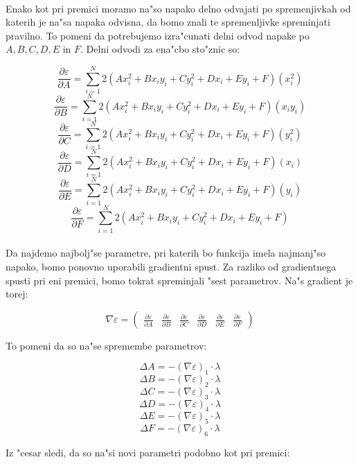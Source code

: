 \documentclass[a4paper, 12pt]{article}
\begin{document}
	\paragraph{}
	Enako kot pri premici moramo na"so napako delno odvajati po spremenjivkah od katerih je na"sa napaka odvisna, da bomo znali te spremenljivke spreminjati pravilno. To pomeni da potrebujemo izra"cunati delni odvod napake po $A, B, C, D, E$ in $F$. Delni odvodi za ena"cbo sto"znic so:
	
	$$\frac{\partial \varepsilon}{\partial A} = \sum_{i=1}^{N}2(Ax_i^2 + Bx_iy_i + Cy_i^2 + Dx_i + Ey_i + F)(x_i^2)$$
	$$\frac{\partial \varepsilon}{\partial B} = \sum_{i=1}^{N}2(Ax_i^2 + Bx_iy_i + Cy_i^2 + Dx_i + Ey_i + F)(x_iy_i)$$
	$$\frac{\partial \varepsilon}{\partial C} = \sum_{i=1}^{N}2(Ax_i^2 + Bx_iy_i + Cy_i^2 + Dx_i + Ey_i + F)(y_i^2)$$
	$$\frac{\partial \varepsilon}{\partial D} = \sum_{i=1}^{N}2(Ax_i^2 + Bx_iy_i + Cy_i^2 + Dx_i + Ey_i + F)(x_i)$$
	$$\frac{\partial \varepsilon}{\partial E} = \sum_{i=1}^{N}2(Ax_i^2 + Bx_iy_i + Cy_i^2 + Dx_i + Ey_i + F)(y_i)$$
	$$\frac{\partial \varepsilon}{\partial F} = \sum_{i=1}^{N}2(Ax_i^2 + Bx_iy_i + Cy_i^2 + Dx_i + Ey_i + F)$$
	
	\paragraph{}
	Da najdemo najbolj"se parametre, pri katerih bo funkcija imela najmanj"so napako, bomo ponovno uporabili gradientni spust. Za razliko od gradientnega spusti pri eni premici, bomo tokrat spreminjali "sest parametrov. Na"s gradient je torej:
	
	$$\nabla \varepsilon = \begin{pmatrix}
	\frac{\partial \varepsilon}{\partial A} &
	\frac{\partial \varepsilon}{\partial B} &
	\frac{\partial \varepsilon}{\partial C} &
	\frac{\partial \varepsilon}{\partial D} &
	\frac{\partial \varepsilon}{\partial E} &
	\frac{\partial \varepsilon}{\partial F}
	\end{pmatrix}$$
	
	To pomeni da so na"se spremembe parametrov:
	
	$$\Delta A = -(\nabla \varepsilon)_1 \cdot \lambda$$
	$$\Delta B = -(\nabla \varepsilon)_2 \cdot \lambda$$
	$$\Delta C = -(\nabla \varepsilon)_3 \cdot \lambda$$
	$$\Delta D = -(\nabla \varepsilon)_4 \cdot \lambda$$
	$$\Delta E = -(\nabla \varepsilon)_5 \cdot \lambda$$
	$$\Delta F = -(\nabla \varepsilon)_6 \cdot \lambda$$
	
	Iz "cesar sledi, da so na"si novi parametri podobno kot pri premici:
	
\end{document}
